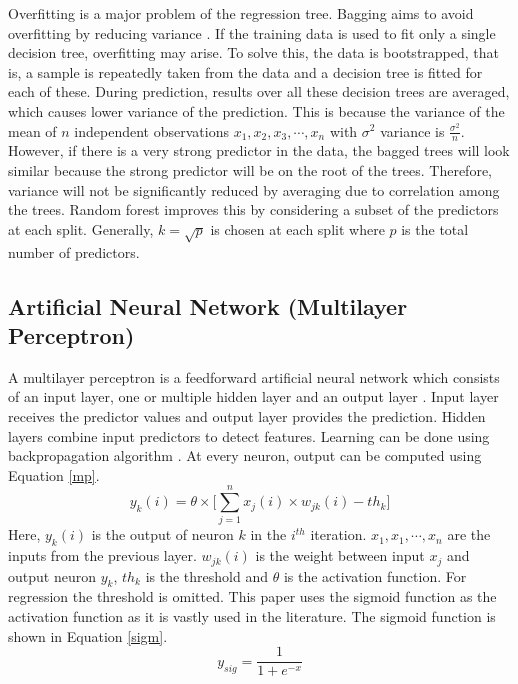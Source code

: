 \documentclass[preprint,review,12pt]{elsarticle}
\begin{document}
Overfitting is a major problem of the regression tree. Bagging aims to avoid overfitting by reducing variance \cite{de2007boosted}. If the training data is used to fit only a single decision tree, overfitting may arise. To solve this, the data is  bootstrapped, that is, a sample is repeatedly taken from the data and a decision tree is fitted for each of these. During prediction, results over all these decision trees are averaged, which causes lower variance of the prediction. This is because the variance of the mean of $n$ independent observations $x_{1},x_{2},x_{3},\cdots,x_{n}$ with $\sigma^{2}$ variance is $\frac{\sigma^{2}}{n}$. However, if there is a very strong predictor in the data, the bagged trees will look similar because the strong predictor will be on the root of the trees. Therefore, variance will not be significantly reduced by averaging due to correlation among the trees. Random forest improves this by considering a subset of the predictors at each split. Generally, $k=\sqrt{p}$ is chosen at each split where $p$ is the total number of predictors.
\subsection{Artificial Neural Network (Multilayer Perceptron)}
A multilayer perceptron is a feedforward artificial neural network which consists of an input layer, one or multiple hidden layer and an output layer \cite{rosenblatt1958perceptron}. Input layer receives the predictor values and output layer provides the prediction. Hidden layers combine input predictors to detect features. Learning can be done using backpropagation algorithm \cite{rumelhart1985learning}. At every neuron, output can be computed using Equation \ref{mp}.
\begin{equation}
y_{k}(i)= \theta \times \Big[\sum_{j=1}^{n} x_{j}(i)\times w_{jk}(i)-th_{k}\Big]
\label{mp}
\end{equation}
Here, $y_{k}(i)$ is the output of neuron $k$ in the $i^{th}$ iteration. $x_{1},x_{1},\cdots,x_{n}$ are the inputs from the previous layer. $w_{jk}(i)$ is the weight between input $x_{j}$ and output neuron $y_{k}$, $th_{k}$ is the threshold and $\theta$ is the activation function. For regression the threshold is omitted. This paper uses the sigmoid function as the activation function as it is vastly used in the literature. The sigmoid function is shown in Equation \ref{sigm}.
\begin{equation}
y_{sig}=\frac{1}{1+e^{-x}}
\label{sigm}
\end{equation}
\end{document}
